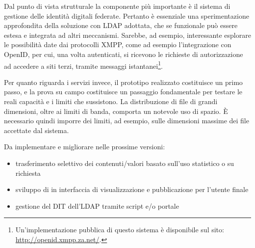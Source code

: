 Dal punto di vista strutturale la componente più importante è il
sistema di gestione delle identità digitali federate. Pertanto è
essenziale una sperimentazione approfondita della soluzione con LDAP
adottata, che se funzionale può essere estesa e integrata ad altri
meccanismi. Sarebbe, ad esempio, interessante esplorare le possibilità
date dai protocolli XMPP, come ad esempio l'integrazione con OpenID,
per cui, una volta autenticati, si ricevono le richieste di
autorizzazione ad accedere a siti terzi, tramite messaggi
istantanei\footnote{Un'implementazione pubblica di questo sistema è
  disponibile sul sito: \url{http://openid.xmpp.za.net/}.}.

Per quanto riguarda i servizi invece, il prototipo realizzato
costituisce un primo passo, e la prova su campo costituisce un
passaggio fondamentale per testare le reali capacità e i limiti che
sussistono. La distribuzione di file di grandi dimensioni, oltre ai
limiti di banda, comporta un notevole uso di spazio. È necessario
quindi imporre dei limiti, ad esempio, sulle dimensioni massime dei file
accettate dal sistema. 

Da implementare e migliorare nelle prossime versioni:
\begin{itemize}
\item trasferimento selettivo dei contenuti/valori basato sull'uso
  statistico o su richiesta
\item sviluppo di in interfaccia di visualizzazione e pubblicazione
  per l'utente finale
\item gestione del DIT dell'LDAP tramite script e/o portale
\end{itemize}

